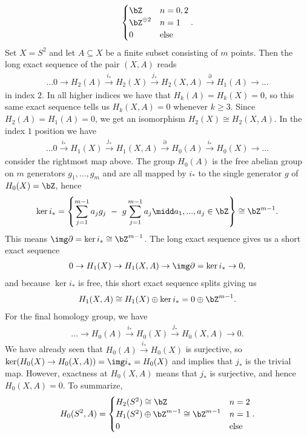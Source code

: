 \begin{homework}[e]
\begin{prf}
\begin{enumerate}[(a)]
\begin{align*}
\begin{cases}
          \bZ & n = 0,2 \\
          \bZ^{\oplus 2} & n = 1 \\
          0 & \text{else}
        \end{cases}.
      \end{align*}
      Set $X = S^2$ and let $A \subseteq X$ be a finite subset consisting of $m$ points. Then the long exact sequence of the pair $(X,A)$ reads
      \begin{align*}
        ... 0 \to H_2(A) \xrightarrow{i_*} H_2(X) \xrightarrow{j_*} H_2(X,A) \xrightarrow{\partial} H_1(A) \to ...
      \end{align*}
      in index $2$. In all higher indices we have that $H_k(A) = H_k(X) = 0$, so this same exact sequence tells us $H_k(X,A) = 0$ whenever $k \geq 3$. Since $H_2(A) = H_1(A) = 0$, we get an isomorphism $H_2(X) \cong H_2(X,A)$. In the index $1$ position we have
      \begin{align*}
        ... 0 \xrightarrow{i_*} H_1(X) \xrightarrow{j_*} H_1(X,A) \xrightarrow{\partial} H_0(A) \xrightarrow{i_*} H_0(X) \to ...
      \end{align*}
      consider the rightmost map above. The group $H_0(A)$ is the free abelian group on $m$ generators $g_1,...,g_m$ and are all mapped by $i_*$ to the single generator $g$ of $H_0(X) = \bZ$, hence
      \begin{align*}
        \ker i_* = \left\{\sum_{j=1}^{m-1} a_jg_j ~-~ g \sum_{j=1}^{m-1}a_j \midd a_1,...,a_j \in \bZ\right\} \cong \bZ^{m-1}.
      \end{align*}
      This means $\img \partial = \ker i_* \cong \bZ^{m-1}$. The long exact sequence gives us a short exact sequence
      \begin{align*}
        0 \to H_1(X) \to H_1(X,A) \to \img \partial = \ker i_* \to 0,
      \end{align*}
      and because $\ker i_*$ is free, this short exact sequence splits giving us
      \begin{align*}
        H_1(X,A) \cong H_1(X) \oplus \ker i_* = 0 \oplus \bZ^{m-1}.
      \end{align*}
      For the final homology group, we have
      \begin{align*}
        ... \to H_0(A) \xrightarrow{i_*} H_0(X)\xrightarrow{j_*} H_0(X,A) \to 0.
      \end{align*}
      We have already seen that $H_0(A)\xrightarrow{i_*}H_0(X)$ is surjective, so $\ker (H_0(X) \to H_0(X,A)) = \img i_* = H_0(X)$ and implies that $j_*$ is the trivial map. However, exactness at $H_0(X,A)$ means that $j_*$ is surjective, and hence $H_0(X,A) = 0$. To summarize,
      \begin{align*}
        H_0(S^2,A) =
        \begin{cases}
          H_2(S^2) \cong \bZ & n = 2 \\
          H_1(S^2) \oplus \bZ^{m-1} \cong \bZ^{m-1} & n = 1 \\
          0 & \text{else}
        \end{cases}.
      \end{align*}


\end{enumerate}
\end{prf}
\end{homework}
